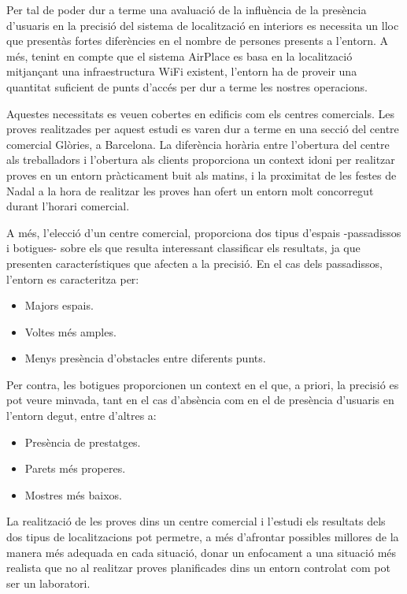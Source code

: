 
Per tal de poder dur a terme una avaluació de la influència de la presència d'usuaris en la precisió del sistema de localització en interiors es necessita un lloc que presentàs fortes diferències en el nombre de persones presents a l'entorn. A més, tenint en compte que el sistema AirPlace es basa en la localització mitjançant una infraestructura WiFi existent, l'entorn ha de proveir una quantitat suficient de punts d'accés per dur a terme les nostres operacions.

Aquestes necessitats es veuen cobertes en edificis com els centres comercials. Les proves realitzades per aquest estudi es varen dur a terme en una secció del centre comercial Glòries, a Barcelona. La diferència horària entre l'obertura del centre als treballadors i l'obertura als clients proporciona un context idoni per realitzar proves en un entorn pràcticament buit als matins, i la proximitat de les festes de Nadal a la hora de realitzar les proves han ofert un entorn molt concorregut durant l'horari comercial.

A més, l'elecció d'un centre comercial, proporciona dos tipus d'espais -passadissos i botigues- sobre els que resulta interessant classificar els resultats, ja que presenten característiques que afecten a la precisió.
En el cas dels passadissos, l'entorn es caracteritza per:

\begin{itemize}
    \item Majors espais.
    \item Voltes més amples.
    \item Menys presència d'obstacles entre diferents punts.
\end{itemize}

Per contra, les botigues proporcionen un context en el que, a priori, la precisió es pot veure minvada, tant en el cas d'absència com en el de presència d'usuaris en l'entorn degut, entre d'altres a:

\begin{itemize}
    \item Presència de prestatges.
    \item Parets més properes.
    \item Mostres més baixos.
\end{itemize}

La realització de les proves dins un centre comercial i l'estudi els resultats dels dos tipus de localitzacions pot permetre, a més d'afrontar possibles millores de la manera més adequada en cada situació, donar un enfocament a una situació més realista que no al realitzar proves planificades dins un entorn controlat com pot ser un laboratori.

